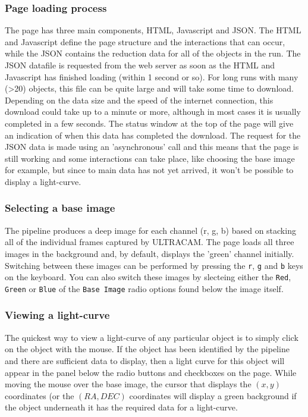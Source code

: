 \subsubsection{Page loading process}
The page has three main components, HTML, Javascript and JSON. The HTML and Javascript define the page structure and the interactions that can occur, while the JSON contains the reduction data for all of the objects in the run. The JSON datafile is requested from the web server as soon as the HTML and Javascript has finished loading (within 1 second or so). For long runs with many (>20) objects, this file can be quite large and will take some time to download. Depending on the data size and the speed of the internet connection, this download could take up to a minute or more, although in most cases it is usually completed in a few seconds. The status window at the top of the page will give an indication of when this data has completed the download. The request for the JSON data is made using an 'asynchronous' call and this means that the page is still working and some interactions can take place, like choosing the base image for example, but since to main data has not yet arrived, it won't be possible to display a light-curve.  

\subsubsection{Selecting a base image}
The pipeline produces a deep image for each channel (r, g, b) based on stacking all of the individual frames captured by ULTRACAM. The page loads all three images in the background and, by default, displays the 'green' channel initially. Switching between these images can be performed by pressing the \texttt{r}, \texttt{g} and \texttt{b} keys on the keyboard. You can also switch these images by slecteing either the \texttt{Red},  \texttt{Green} or \texttt{Blue} of the \texttt{Base Image} radio options found below the image itself.

\subsubsection{Viewing a light-curve}
The quickest way to view a light-curve of any particular object is to simply click on the object with the mouse. If the object has been identified by the pipeline and there are sufficient data to display, then a light curve for this object will appear in the panel below the radio buttons and checkboxes on the page. While moving the mouse over the base image, the cursor that displays the $(x, y)$ coordinates (or the $(RA, DEC)$ coordinates will display a green background if the object underneath it has the required data for a light-curve.


